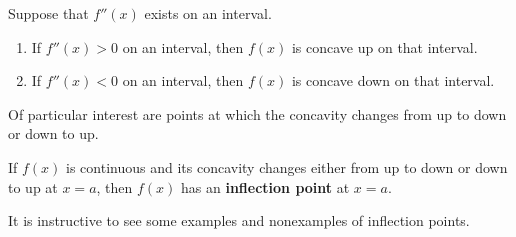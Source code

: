 \begin{mainTheorem}
Suppose that $f''(x)$ exists on an interval.
\begin{enumerate}
\item If $f''(x)>0$ on an interval, then $f(x)$ is concave up on that interval.
\item If $f''(x)<0$ on an interval, then $f(x)$ is concave down on that interval.
\end{enumerate}
\end{mainTheorem}


Of particular interest are points at which the concavity changes from
up to down or down to up. 

\begin{definition}
If $f(x)$ is continuous and its concavity changes either from up to
down or down to up at $x=a$, then $f(x)$ has an \textbf{inflection
  point} at $x=a$.
\end{definition}

It is instructive to see some examples and nonexamples of inflection
points.

